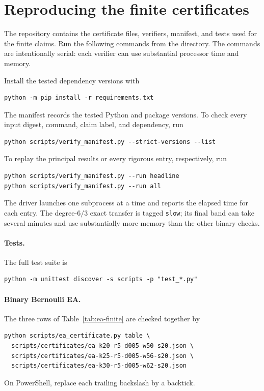 \section{Reproducing the finite certificates}
\label{app:artifact}

The repository contains the certificate files, verifiers, manifest, and tests
used for the finite claims.  Run the following commands from the
 directory.  The commands are intentionally serial: each
verifier can use substantial processor time and memory.

Install the tested dependency versions with
\begin{verbatim}
python -m pip install -r requirements.txt
\end{verbatim}
The manifest records the tested Python and package versions.  To check every
input digest, command, claim label, and dependency, run
\begin{verbatim}
python scripts/verify_manifest.py --strict-versions --list
\end{verbatim}
To replay the principal results or every rigorous entry, respectively, run
\begin{verbatim}
python scripts/verify_manifest.py --run headline
python scripts/verify_manifest.py --run all
\end{verbatim}
The driver launches one subprocess at a time and reports the elapsed time for
each entry.  The degree-$6/3$ exact transfer is tagged \texttt{slow}; its final
band can take several minutes and use substantially more memory than the
other binary checks.

\paragraph{Tests.}
The full test suite is
\begin{verbatim}
python -m unittest discover -s scripts -p "test_*.py"
\end{verbatim}

\paragraph{Binary Bernoulli EA.}
The three rows of Table~\ref{tab:ea-finite} are checked together by
\begin{verbatim}
python scripts/ea_certificate.py table \
  scripts/certificates/ea-k20-r5-d005-w50-s20.json \
  scripts/certificates/ea-k25-r5-d005-w56-s20.json \
  scripts/certificates/ea-k30-r5-d005-w62-s20.json
\end{verbatim}
On PowerShell, replace each trailing backslash by a backtick.

